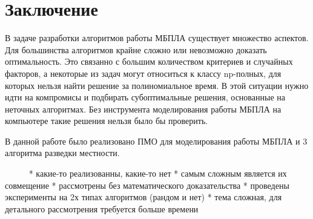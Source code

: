 \section{Заключение}

В задаче разработки алгоритмов работы МБПЛА существует множество аспектов.
Для большинства алгоритмов крайне сложно или невозможно доказать оптимальность.
Это связанно с большим количеством критериев и случайных факторов, а некоторые
из задач могут относиться к классу np-полных, для которых нельзя найти
решение за полиномиальное время. В этой ситуации нужно идти на компромисы и 
подбирать субоптимальные решения, основанные на неточных алгоритмах.
Без инструмента моделирования работы МБПЛА на компьютере такие решения
нельзя было бы проверить.

В данной работе было реализовано ПМО для моделирования работы МБПЛА и 3
алгоритма разведки местности.

~~~~~
* какие-то реализованны, какие-то нет
* самым сложным является их совмещение
* рассмотрены без математического доказательства
* проведены эксперименты на 2х типах алгоритмов (рандом и нет)
* тема сложная, для детального рассмотрения требуется больше
  времени
